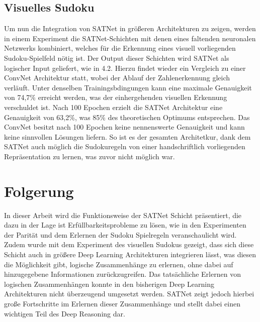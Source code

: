 \subsection{Visuelles Sudoku}
\label{subsec:visSud}
Um nun die Integration von SATNet in größeren Architekturen zu zeigen, werden in einem Experiment die SATNet-Schichten mit denen eines faltenden neuronalen Netzwerks kombiniert, welches für die Erkennung eines visuell vorliegenden Sudoku-Spielfeld nötig ist. Der Output dieser Schichten wird SATNet als logischer Input geliefert, wie in 4.2. Hierzu findet wieder ein Vergleich zu einer ConvNet Architektur statt, wobei der Ablauf der Zahlenerkennung gleich verläuft. Unter denselben Trainingsbdingungen kann eine maximale Genauigkeit von 74,7\% erreicht werden, was der einhergehenden visuellen Erkennung verschuldet ist. Nach 100 Epochen erzielt die SATNet Architektur eine Genauigkeit von 63,2\%, was 85\% des theoretischen Optimums entsprechen. Das ConvNet besitzt nach 100 Epochen keine nennenswerte Genauigkeit und kann keine sinnvollen Lösungen liefern. So ist es der gesamten Architetkur, dank dem SATNet auch möglich die Sudokuregeln von einer handschriftlich vorliegenden Repräsentation zu lernen, was zuvor nicht möglich war. \cite[p.~7-8]{https://doi.org/10.48550/arxiv.1905.12149}

\section{Folgerung}
\label{sec:conclusion}
In dieser Arbeit wird die Funktionsweise der SATNet Schicht präsentiert, die dazu in der Lage ist Erfüllbarkeitsprobleme zu lösen, wie in den Experimenten der Parität und dem Erlernen der Sudoku Spielregeln veranschaulicht wird. Zudem wurde mit dem Experiment des visuellen Sudokus gezeigt, dass sich diese Schicht auch in größere Deep Learning Architekturen integrieren lässt, was diesen die Möglichkeit gibt, logische Zusammenhänge zu erlernen, ohne dabei auf hinzugegebene Informationen zurückzugreifen. Das tatsächliche Erlernen von logischen Zusammenhängen konnte in den bisherigen Deep Learning Architekturen nicht überzeugend umgesetzt werden. SATNet zeigt jedoch hierbei große Fortschritte im Erlernen dieser Zusammenhänge und stellt dabei einen wichtigen Teil des Deep Reasoning dar.





